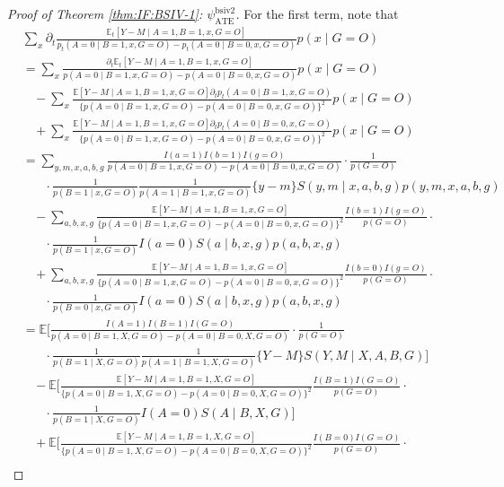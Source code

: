 \documentclass[10pt]{article}
\begin{document}
\begin{proof}[Proof of Theorem \ref{thm:IF:BSIV-1}: $\psi_{\text{ATE}}^{\text{bsiv2}}$]
For the first term, note that
{\footnotesize \begin{align*}
    &\sum_{x}\partial_t\frac{\mathbb{E}_t[Y-M\mid A=1,B=1,x,G=O]}{p_t(A=0\mid B=1,x,G=O)-p_t(A=0\mid B=0,x,G=O)}p(x\mid G=O)\\
    &=\sum_{x}\frac{\partial_t\mathbb{E}_t[Y-M\mid A=1,B=1,x,G=O]}{p(A=0\mid B=1,x,G=O)-p(A=0\mid B=0,x,G=O)}p(x\mid G=O)\\
    &\ \ \ \ -\sum_{x}\frac{\mathbb{E}[Y-M\mid A=1,B=1,x,G=O]\partial_tp_t(A=0\mid B=1,x,G=O)}{\{p(A=0\mid B=1,x,G=O)-p(A=0\mid B=0,x,G=O)\}^2}p(x\mid G=O)\\
    &\ \ \ \ +\sum_{x}\frac{\mathbb{E}[Y-M\mid A=1,B=1,x,G=O]\partial_tp_t(A=0\mid B=0,x,G=O)}{\{p(A=0\mid B=1,x,G=O)-p(A=0\mid B=0,x,G=O)\}^2}p(x\mid G=O)\\
    &=\sum_{y,m,x,a,b,g}\frac{I(a=1)I(b=1)I(g=O)}{p(A=0\mid B=1,x,G=O)-p(A=0\mid B=0,x,G=O)}\cdot\frac{1}{p(G=O)}\\
    &\ \ \ \ \ \ \ \ \cdot\frac{1}{p(B=1\mid x,G=O)}\frac{1}{p(A=1\mid B=1,x,G=O)}\{y-m\}S(y,m\mid x,a,b,g)p(y,m,x,a,b,g)\\
    &\ \ \ \ -\sum_{a,b,x,g}\frac{\mathbb{E}[Y-M\mid A=1,B=1,x,G=O]}{\{p(A=0\mid B=1,x,G=O)-p(A=0\mid B=0,x,G=O)\}^2}\frac{I(b=1)I(g=O)}{p(G=O)}\cdot\\
    &\ \ \ \ \ \ \ \ \cdot\frac{1}{p(B=1\mid x, G=O)}I(a=0)S(a\mid b,x,g)p(a,b,x,g)\\
    &\ \ \ \ +\sum_{a,b,x,g}\frac{\mathbb{E}[Y-M\mid A=1,B=1,x,G=O]}{\{p(A=0\mid B=1,x,G=O)-p(A=0\mid B=0,x,G=O)\}^2}\frac{I(b=0)I(g=O)}{p(G=O)}\cdot\\
    &\ \ \ \ \ \ \ \ \cdot\frac{1}{p(B=0\mid x, G=O)}I(a=0)S(a\mid b,x,g)p(a,b,x,g)\\
    &=\mathbb{E}\bigg[\frac{I(A=1)I(B=1)I(G=O)}{p(A=0\mid B=1,X,G=O)-p(A=0\mid B=0,X,G=O)}\cdot\frac{1}{p(G=O)}\\
    &\ \ \ \ \ \ \ \ \cdot\frac{1}{p(B=1\mid X,G=O)}\frac{1}{p(A=1\mid B=1,X,G=O)}\{Y-M\}S(Y,M\mid X,A,B,G)\bigg]\\
    &\ \ \ \ -\mathbb{E}\bigg[\frac{\mathbb{E}[Y-M\mid A=1,B=1,X,G=O]}{\{p(A=0\mid B=1,X,G=O)-p(A=0\mid B=0,X,G=O)\}^2}\frac{I(B=1)I(G=O)}{p(G=O)}\cdot\\
    &\ \ \ \ \ \ \ \ \cdot\frac{1}{p(B=1\mid X, G=O)}I(A=0)S(A\mid B,X,G)\bigg]\\
    &\ \ \ \ +\mathbb{E}\bigg[\frac{\mathbb{E}[Y-M\mid A=1,B=1,X,G=O]}{\{p(A=0\mid B=1,X,G=O)-p(A=0\mid B=0,X,G=O)\}^2}\frac{I(B=0)I(G=O)}{p(G=O)}\cdot\\

\end{align*}}
\end{proof}
\end{document}
